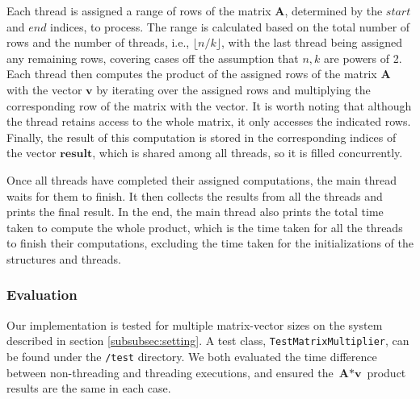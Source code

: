 \documentclass[acmlarge]{acmart}
\begin{document}
Each thread is assigned a range of rows of the matrix $\mathbf{A}$, determined by the $start$ and $end$ indices, to process. The range is calculated based on the total number of rows and the number of threads, i.e., $\lfloor n/k \rfloor$, with the last thread being assigned any remaining rows, covering cases off the assumption that $n,k$ are powers of 2. Each thread then computes the product of the assigned rows of the matrix $\mathbf{A}$ with the vector $\mathbf{v}$ by iterating over the assigned rows and multiplying the corresponding row of the matrix with the vector. It is worth noting that although the thread retains access to the whole matrix, it only accesses the indicated rows. Finally, the result of this computation is stored in the corresponding indices of the vector $\mathbf{result}$, which is shared among all threads, so it is filled concurrently.

Once all threads have completed their assigned computations, the main thread waits for them to finish. It then collects the results from all the threads and prints the final result. In the end, the main thread also prints the total time taken to compute the whole product, which is the time taken for all the threads to finish their computations, excluding the time taken for the initializations of the structures and threads.

\subsubsection{Evaluation}
Our implementation is tested for multiple matrix-vector sizes on the system described in section
\ref{subsubsec:setting}.
A test class, \texttt{TestMatrixMultiplier}, can be found under the \texttt{/test} directory.
We both evaluated the time difference between non-threading and threading executions, and ensured the $\textbf{A} * \textbf{v}$ product results are the same in each case.

\end{document}
